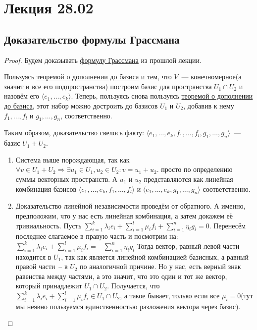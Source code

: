 \section{Лекция 28.02}\label{3}
\subsection{Доказательство формулы Грассмана}
\begin{proof}
    Будем доказывать \hyperref[thm:Формула Грассмана]{формулу Грассмана} из прошлой лекции.

    Пользуясь \hyperref[thm:О дополнении до базиса]{теоремой о дополнении до базиса}
    и тем, что $V$~--- конечномерное(а значит и все его подпространства)
    построим базис для пространства $U_1\cap U_2$ и назовём его $\langle e_1,\dots, e_k\rangle$. 
    Теперь, пользуясь снова пользуясь \hyperref[thm:О дополнении до базиса]{теоремой о дополнении до базиса},
    этот набор можно достроить до базисов $U_1$ и $U_2$,
    добавив к нему $f_1,\dots,f_l$ и $g_1,\dots,g_n$, соответственно.

    Таким образом, доказательство свелось факту: $\langle e_1,\dots,e_k,f_1,\dots,f_l,g_1,\dots,g_n\rangle$~---
    базис $U_1+U_2$.
    \begin{enumerate}
        \item Система выше порождающая, так как 
            $\forall v\in U_1 + U_2 \Rightarrow \exists u_1\in U_1, u_2\in U_2\colon v = u_1+u_2$.
            просто по определению суммы векторных пространств. А $u_1$ и $u_2$ представляются как линейная
            комбинация базисов 
            $\langle e_1,\dots,e_k,f_1,\dots,f_l\rangle$ и $\langle e_1,\dots,e_k,g_1,\dots,g_n\rangle$
            соответственно.
        \item
            Доказательство линейной независимости проведём от обратного.
            А именно, предположим, что у нас есть линейная комбинация, а затем докажем её тривиальность.
            Пусть $\sum\limits_{i=1}^{k}\lambda_ie_i +
                   \sum\limits_{i=1}^{l}\mu_if_i + 
                   \sum\limits_{i=1}^{n}\eta_ig_i = 0$.
            Перенесём последнее слагаемое в правую часть и посмотрим на:
                $\sum\limits_{i=1}^{k}\lambda_ie_i +
                 \sum\limits_{i=1}^{l}\mu_if_i = 
                -\sum\limits_{i=1}^{n}\eta_ig_i$
            Тогда вектор, равный левой части находится в $U_1$, так как является линейной комбинацией
            базисных, а равный правой части~-- в $U_2$ по аналогичной причине. Но у нас, есть верный знак
            равенства между частями, а это значит, что это один и тот же вектор, который принадлежит $U_1\cap U_2$.
            Получается, что $\sum\limits_{i=1}^{k}\lambda_ie_i + \sum\limits_{i=1}^{l}\mu_if_i \in U_1\cap U_2$,
            а такое бывает, только если все $\mu_i = 0$(тут мы неявно пользуемся единственностью разложения
            вектора через базис).


\end{enumerate}
\end{proof}
